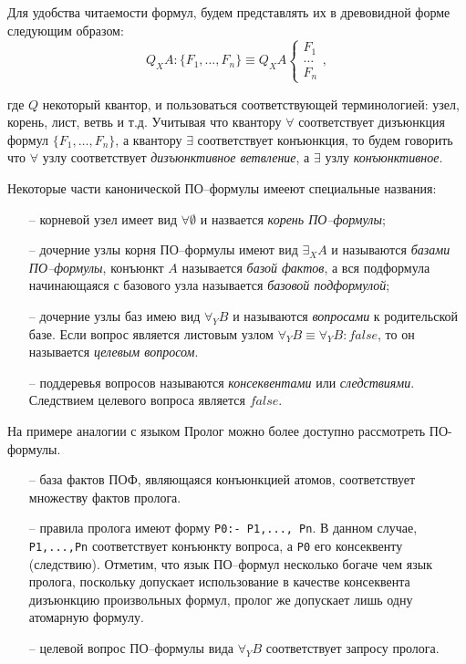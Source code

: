 Для удобства читаемости формул, будем представлять их в древовидной форме следующим образом:
$$Q_XA\colon\{F_1,\ldots,F_n\} \equiv Q_XA \left\{
\begin{array}{lcl}
 F_1 \\
 \ldots \\
 F_n
\end{array}
\right.,$$

\noindent{}где $Q$ некоторый квантор, и пользоваться соответствующей терминологией: узел, корень, лист, ветвь и т.д. Учитывая что квантору $\forall$ соответствует дизъюнкция формул $\{F_1,\ldots,F_n\}$, а квантору $\exists$ соответствует конъюнкция, то будем говорить что $\forall$ узлу соответствует {\em дизъюнктивное ветвление}, а $\exists$ узлу {\em конъюнктивное}.

Некоторые части канонической ПО--формулы имееют специальные названия:
\begin{itemize}
\item[--] корневой узел имеет вид $\forall \emptyset$ и назвается {\em корень ПО--формулы};

\item[--] дочерние узлы корня ПО--формулы имеют вид $\exists_XA$ и называются {\em базами ПО--формулы}, конъюнкт $A$ называется {\em базой фактов}, а вся подформула начинающаяся с базового узла называется {\em базовой подформулой};

\item[--] дочерние узлы баз имею вид $\forall_YB$ и называются {\em вопросами} к родительской базе. Если вопрос является листовым узлом $\forall_YB \equiv \forall_YB\colon false$, то он называется {\em целевым вопросом}. %

\item[--] поддеревья вопросов называются {\em консеквентами} или {\em следствиями}. Следствием целевого вопроса является $false$.

\end{itemize}


На примере аналогии с языком Пролог можно более доступно рассмотреть ПО-формулы.

\begin{itemize}
\item[--] база фактов ПОФ, являющаяся конъюнкцией атомов, соответствует множеству фактов пролога.
\item[--] правила пролога имеют форму \texttt{P0:- P1,..., Pn}. В данном случае, \texttt{P1,...,Pn} соответствует конъюнкту вопроса, а \texttt{P0} его консеквенту (следствию). Отметим, что язык ПО--формул несколько богаче чем язык пролога, поскольку допускает использование в качестве консеквента дизъюнкцию произвольных формул, пролог же допускает лишь одну атомарную формулу.
\item[--] целевой вопрос ПО--формулы вида $\forall_YB$ соответствует запросу пролога.
\end{itemize}

